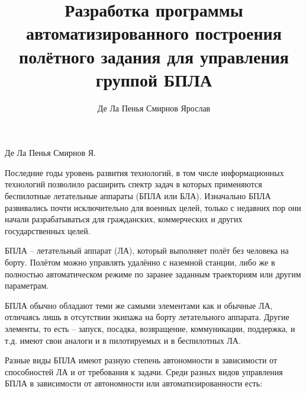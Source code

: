 \documentclass{itmo-student-thesis}
\begin{document}
\title{Разработка программы автоматизированного построения полётного задания для
управления группой БПЛА}
\author{Де Ла Пенья Смирнов Ярослав}{Де Ла Пенья Смирнов Я.}




\tableofcontents

\startprefacepage

Последние годы уровень развития технологий, в том числе информационных
технологий позволило расширить спектр задач в которых применяются беспилотные
летательные аппараты (БПЛА или БЛА). Изначально БПЛА развивались почти
исключительно для военных целей, только с недавних пор они начали
разрабатываться для гражданских, коммерческих и других государственных целей.

БПЛА -- летательный аппарат (ЛА), который выполняет полёт без человека на борту.
Полётом можно управлять удалённо с наземной станции, либо же в полностью
автоматическом режиме по заранее заданным траекториям или другим параметрам.

БПЛА обычно обладают теми же самыми элементами как и обычные ЛА, отличаясь лишь
в отсутствии экипажа на борту летательного аппарата. Другие элементы, то есть --
запуск, посадка, возвращение, коммуникации, поддержка, и т.д. имеют свои аналоги
и в пилотируемых и в беспилотных ЛА.\cite{austin-uas}

Разные виды БПЛА имеют разную степень автономности в зависимости от способностей
ЛА и от требования к задачи. Среди разных видов управления БПЛА в зависимости от
автономности или автоматизированности есть\cite{douglas-intro-to-uas}:
\end{document}
